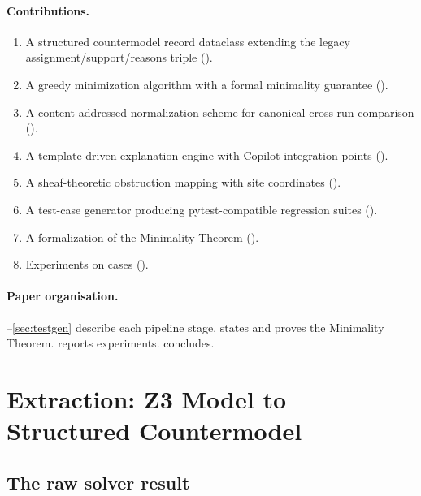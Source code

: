 \documentclass[11pt]{article}
\begin{document}
\paragraph{Contributions.}
\begin{enumerate}[leftmargin=1.5em]
  \item A structured countermodel record dataclass extending the
        legacy assignment/support/reasons triple
        ().
  \item A greedy minimization algorithm with a formal minimality
        guarantee ().
  \item A content-addressed normalization scheme for canonical
        cross-run comparison ().
  \item A template-driven explanation engine with Copilot integration
        points ().
  \item A sheaf-theoretic obstruction mapping with site coordinates
        ().
  \item A test-case generator producing pytest-compatible regression
        suites ().
  \item A \LEAN{} formalization of the Minimality Theorem
        ().
  \item Experiments on \numcases{} cases ().
\end{enumerate}

\paragraph{Paper organisation.}
--\ref{sec:testgen} describe each pipeline stage.
 states and proves the Minimality Theorem.
 reports experiments.
 concludes.


\section{Extraction: Z3 Model to Structured Countermodel}
\label{sec:extraction}

\subsection{The raw solver result}
\end{document}
